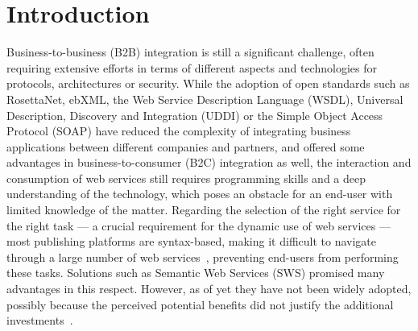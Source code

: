 
\section{Introduction}
\label{sec:introduction}

Business-to-business (B2B) integration is still a significant challenge, often requiring extensive efforts in terms of different aspects and technologies for protocols, architectures or security.
While the adoption of open standards 
such as RosettaNet, ebXML, the Web Service Description Language (WSDL), Universal Description, Discovery and Integration (UDDI) or the Simple Object Access Protocol (SOAP)
have reduced the complexity of integrating business applications between different companies and partners,
and offered some advantages in business-to-consumer (B2C) integration as well, the interaction and consumption of web services still requires programming skills and a deep understanding of the  technology, which poses an obstacle for an end-user with limited knowledge of the matter. %
Regarding the selection of the right service for the right task --- a crucial requirement for the dynamic use of web services --- most publishing platforms are syntax-based, %
making it difficult to navigate through a large number of web services~\cite{pilioura_acm2009}, 
preventing end-users from performing these tasks. 
Solutions such as Semantic Web Services (SWS) promised many advantages in this respect.
However, as of yet they have not been widely adopted, 
possibly because the perceived potential benefits did not justify the additional investments~\cite{shi2007}.

